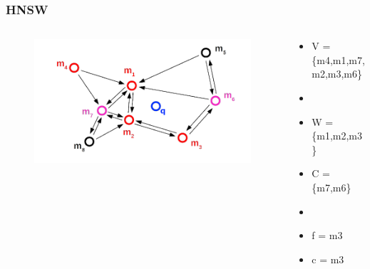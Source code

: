 \documentclass{beamer}
\begin{document}
	\begin{frame}
		\frametitle{HNSW}
		\begin{columns}[T] %
			\begin{column}{.6\textwidth}
				\begin{figure}
					\includegraphics[scale=0.3]{figures/HNSW_b10.png}
				\end{figure}
			\end{column}%
			\hfill%
			\begin{column}{.4\textwidth}
				\begin{itemize}
					\item V = \{m4,m1,m7,m2,m3,m6\}
					\item[]
					\item W = \{m1,m2,m3\}
					\item C = \{m7,m6\}
					\item[]
					\item f = m3
					\item c = m3
				\end{itemize}
			\end{column}%
		\end{columns}
	\end{frame}
\end{document}
